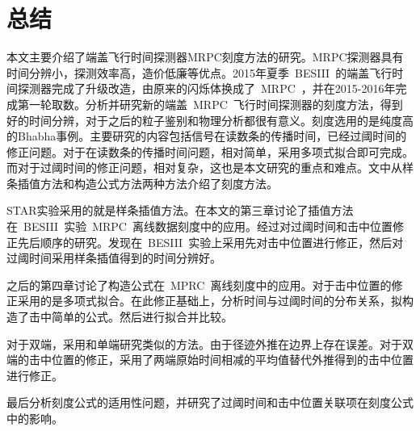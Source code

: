 \chapter{总结}
本文主要介绍了端盖飞行时间探测器MRPC刻度方法的研究。MRPC探测器具有时间分辨小，探测效率高，造价低廉等优点。2015年夏季~BESIII~的端盖飞行时间探测器完成了升级改造，由原来的闪烁体换成了~MRPC~，并在2015-2016年完成第一轮取数。分析并研究新的端盖~MRPC~飞行时间探测器的刻度方法，得到好的时间分辨，对于之后的粒子鉴别和物理分析都很有意义。刻度选用的是纯度高的Bhabha事例。主要研究的内容包括信号在读数条的传播时间，已经过阈时间的修正问题。对于在读数条的传播时间问题，相对简单，采用多项式拟合即可完成。而对于过阈时间的修正问题，相对复杂，这也是本文研究的重点和难点。文中从样条插值方法和构造公式方法两种方法介绍了刻度方法。

STAR实验采用的就是样条插值方法。在本文的第三章讨论了插值方法在~BESIII~实验~MRPC~离线数据刻度中的应用。经过对过阈时间和击中位置修正先后顺序的研究。发现在~BESIII~实验上采用先对击中位置进行修正，然后对过阈时间采用样条插值得到的时间分辨好。

之后的第四章讨论了构造公式在~MPRC~离线刻度中的应用。对于击中位置的修正采用的是多项式拟合。在此修正基础上，分析时间与过阈时间的分布关系，拟构造了击中简单的公式。然后进行拟合并比较。

对于双端，采用和单端研究类似的方法。由于径迹外推在边界上存在误差。对于双端的击中位置的修正，采用了两端原始时间相减的平均值替代外推得到的击中位置进行修正。

最后分析刻度公式的适用性问题，并研究了过阈时间和击中位置关联项在刻度公式中的影响。













